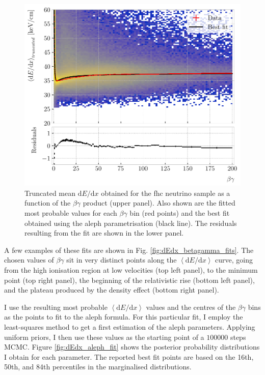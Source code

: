 \begin{figure}[t]
	\centering
	\includegraphics[width=.85\linewidth]{Images/GArSoft_PID/dEdx/dEdx_aleph_data_with_fit.pdf}
	\caption[Truncated mean $\mathrm{d}E/\mathrm{d}x$ as a function of the $\beta\gamma$ product, together with the best fit obtained using the \gls{aleph} parametrisation.]{Truncated mean $\mathrm{d}E/\mathrm{d}x$ obtained for the \gls{fhc} neutrino sample as a function of the $\beta\gamma$ product (upper panel). Also shown are the fitted most probable values for each $\beta\gamma$ bin (red points) and the best fit obtained using the \gls{aleph} parametrisation (black line). The residuals resulting from the fit are shown in the lower panel.}
	\label{fig:dEdx_betagamma_aleph}
\end{figure}

A few examples of these fits are shown in Fig. \ref{fig:dEdx_betagamma_fits}. The chosen values of $\beta\gamma$ sit in very distinct points along the $\left<\mathrm{d}E/\mathrm{d}x\right>$ curve, going from the high ionisation region at low velocities (top left panel), to the minimum point (top right panel), the beginning of the relativistic rise (bottom left panel), and the plateau produced by the density effect (bottom right panel).

I use the resulting most probable $\left<\mathrm{d}E/\mathrm{d}x\right>$ values and the centres of the $\beta\gamma$ bins as the points to fit to the \gls{aleph} formula. For this particular fit, I employ the least-squares method to get a first estimation of the \gls{aleph} parameters. Applying uniform priors, I then use these values as the starting point of a $100000$ steps MCMC. Figure \ref{fig:dEdx_aleph_fit} shows the posterior probability distributions I obtain for each parameter. The reported best fit points are based on the 16th, 50th, and 84th percentiles in the marginalised distributions.

